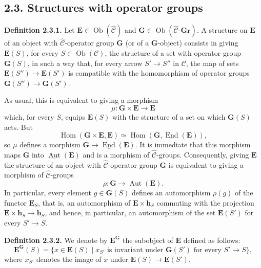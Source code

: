 
\subsection*{2.3. Structures with operator groups}

\medskip
\noindent{}\textbf{Definition 2.3.1.}
Let \(\mathbf E\in\operatorname{Ob}(\widehat{\mathscr C})\) and
\(\mathbf G\in
\operatorname{Ob}(\widehat{\mathscr C}\text{-}\mathbf{Gr})\).
A structure on \(\mathbf E\) of an object with
\(\widehat{\mathscr C}\)-operator group \(\mathbf G\) (or of a
\(\mathbf G\)-object) consists in giving \(\mathbf E(S)\), for every
\(S\in\operatorname{Ob}(\mathscr C)\), the structure of a set with
operator group \(\mathbf G(S)\), in such a way that, for every arrow
\(S'\to S''\) in \(\mathscr C\), the map of sets
\(\mathbf E(S'')\to\mathbf E(S')\) is compatible with the homomorphism
of operator groups \(\mathbf G(S'')\to\mathbf G(S')\).

As usual, this is equivalent to giving a morphism
\[
  \mu:\mathbf G\times\mathbf E\longrightarrow\mathbf E
\]
which, for every \(S\), equips \(\mathbf E(S)\) with the structure of a
set on which \(\mathbf G(S)\) acts. But
\[
  \operatorname{Hom}(\mathbf G\times\mathbf E,\mathbf E)
    \simeq
  \operatorname{Hom}
    (\mathbf G,\underline{\operatorname{End}}(\mathbf E)),
\]
so \(\mu\) defines a morphism
\(\mathbf G\to\underline{\operatorname{End}}(\mathbf E)\). It is
immediate that this morphism maps \(\mathbf G\) into
\(\underline{\operatorname{Aut}}(\mathbf E)\) and is a morphism of
\(\widehat{\mathscr C}\)-groups. Consequently, giving \(\mathbf E\) the
structure of an object with \(\widehat{\mathscr C}\)-operator group
\(\mathbf G\) is equivalent to giving a morphism of
\(\widehat{\mathscr C}\)-groups
\[
  \rho:\mathbf G\longrightarrow
    \underline{\operatorname{Aut}}(\mathbf E).
\]
In particular, every element \(g\in\mathbf G(S)\) defines an
automorphism \(\rho(g)\) of the functor \(\mathbf E_S\), that is, an
automorphism of \(\mathbf E\times\mathbf h_S\) commuting with the
projection \(\mathbf E\times\mathbf h_S\to\mathbf h_S\), and hence, in
particular, an automorphism of the set \(\mathbf E(S')\) for every
\(S'\to S\).

\medskip
\noindent{}\textbf{Definition 2.3.2.}
We denote by \(\mathbf E^{\mathbf G}\) the subobject of \(\mathbf E\)
defined as follows:
\[
  \mathbf E^{\mathbf G}(S)
    =\bigl\{x\in\mathbf E(S)\mid
      x_{S'}\text{ is invariant under }\mathbf G(S')
      \text{ for every }S'\to S\bigr\},
\]
where \(x_{S'}\) denotes the image of \(x\) under
\(\mathbf E(S)\to\mathbf E(S')\).

